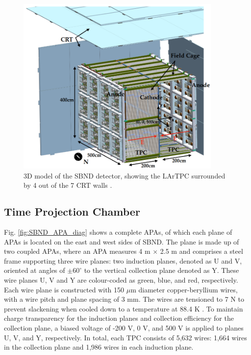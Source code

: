 \begin{figure}[htbp] 
\centering    
\includegraphics[width=0.9\textwidth]{SBND_Pretty}
\caption[Short-Baseline Near Detector 3D Model]{
3D model of the SBND detector, showing the LArTPC surrounded by 4 out of the 7 CRT walls \cite{sbnd_pds_paper}. 
}
\label{fig:SBND_Pretty}
\end{figure}

\subsection{Time Projection Chamber}

Fig. \ref{fig:SBND_APA_diag} shows a complete APAs, of which each plane of APAs is located on the east and west sides of SBND.
The plane is made up of two coupled APAs, where an APA measures 4 m $\times$ 2.5 m and comprises a steel frame supporting three wire planes: two induction planes, denoted as U and V, oriented at angles of $\pm 60^{\circ}$ to the vertical collection plane denoted as Y. 
These wire planes U, V and Y are colour-coded as green, blue, and red, respectively.
Each wire plane is constructed with 150 $\mu$m diameter copper-beryllium wires, with a wire pitch and plane spacing of 3 mm. 
The wires are tensioned to 7 N to prevent slackening when cooled down to a temperature at 88.4 K \cite{SBND_Wires}.
To maintain charge transparency for the induction planes and collection efficiency for the collection plane, a biased voltage of -200 V, 0 V, and 500 V is applied to planes U, V, and Y, respectively.
In total, each TPC consists of 5,632 wires: 1,664 wires in the collection plane and 1,986 wires in each induction plane.

